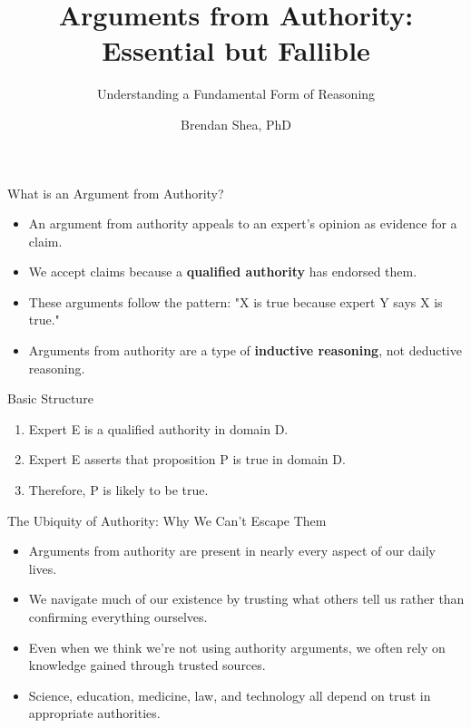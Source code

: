 \documentclass{beamer}
\title{Arguments from Authority: Essential but Fallible}
\subtitle{Understanding a Fundamental Form of Reasoning}
\author{Brendan Shea, PhD}
\begin{document}
\begin{frame}
    \titlepage
\end{frame}

\begin{frame}{What is an Argument from Authority?}
    \begin{itemize}
        \item An argument from authority appeals to an expert's opinion as evidence for a claim.
        \item We accept claims because a \textbf{qualified authority} has endorsed them.
        \item These arguments follow the pattern: "X is true because expert Y says X is true."
        \item Arguments from authority are a type of \textbf{inductive reasoning}, not deductive reasoning.
    \end{itemize}
    
    \begin{block}{Basic Structure}
        \begin{enumerate}
            \item Expert E is a qualified authority in domain D.
            \item Expert E asserts that proposition P is true in domain D.
            \item Therefore, P is likely to be true.
        \end{enumerate}
    \end{block}
\end{frame}

\begin{frame}{The Ubiquity of Authority: Why We Can't Escape Them}
    \begin{itemize}
        \item Arguments from authority are present in nearly every aspect of our daily lives.
        \item We navigate much of our existence by trusting what others tell us rather than confirming everything ourselves.
        \item Even when we think we're not using authority arguments, we often rely on knowledge gained through trusted sources.
        \item Science, education, medicine, law, and technology all depend on trust in appropriate authorities.
    \end{itemize}
    
\end{frame}
\end{document}
